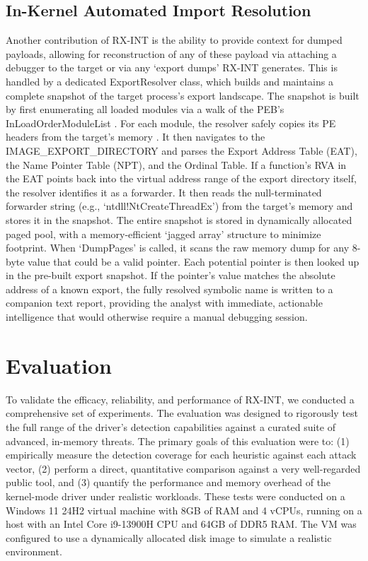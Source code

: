\documentclass[journal]{IEEEtran}
\begin{document}
\subsection{In-Kernel Automated Import Resolution}
Another contribution of RX-INT is the ability to provide context for dumped payloads, allowing for reconstruction of any of these payload via attaching a debugger to the target or via any `export dumps' RX-INT generates. This is handled by a dedicated ExportResolver class, which builds and maintains a complete snapshot of the target process's export landscape.
The snapshot is built by first enumerating all loaded modules via a walk of the PEB's InLoadOrderModuleList \cite{chappellPEB}. For each module, the resolver safely copies its PE headers from the target's memory \cite{nebbett2000native}. It then navigates to the IMAGE\_EXPORT\_DIRECTORY and parses the Export Address Table (EAT), the Name Pointer Table (NPT), and the Ordinal Table.
If a function's RVA in the EAT points back into the virtual address range of the export directory itself, the resolver identifies it as a forwarder. It then reads the null-terminated forwarder string (e.g., `ntdll!NtCreateThreadEx') from the target's memory and stores it in the snapshot. The entire snapshot is stored in dynamically allocated paged pool, with a memory-efficient `jagged array' structure to minimize footprint.
When `DumpPages' is called, it scans the raw memory dump for any 8-byte value that could be a valid pointer. Each potential pointer is then looked up in the pre-built export snapshot. If the pointer's value matches the absolute address of a known export, the fully resolved symbolic name is written to a companion text report, providing the analyst with immediate, actionable intelligence that would otherwise require a manual debugging session.

\section{Evaluation}
\label{sec:evaluation}
To validate the efficacy, reliability, and performance of RX-INT, we conducted a comprehensive set of experiments. The evaluation was designed to rigorously test the full range of the driver's detection capabilities against a curated suite of advanced, in-memory threats. The primary goals of this evaluation were to: (1) empirically measure the detection coverage for each heuristic against each attack vector, (2) perform a direct, quantitative comparison against a very well-regarded public tool, and (3) quantify the performance and memory overhead of the kernel-mode driver under realistic workloads. These tests were conducted on a Windows 11 24H2 virtual machine with 8GB of RAM and 4 vCPUs, running on a host with an Intel Core i9-13900H CPU and 64GB of DDR5 RAM. The VM was configured to use a dynamically allocated disk image to simulate a realistic environment. 
\end{document}
